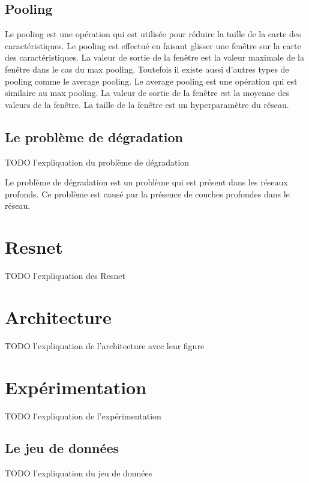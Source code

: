 \documentclass{article}
\begin{document}
\subsection{Pooling}
Le pooling est une opération qui est utilisée pour réduire la taille de la carte des caractéristiques.
Le pooling est effectué en faisant glisser une fenêtre sur la carte des caractéristiques.
La valeur de sortie de la fenêtre est la valeur maximale de la fenêtre dans le cas du max pooling.
Toutefois il existe aussi d'autres types de pooling comme le average pooling.
Le average pooling est une opération qui est similaire au max pooling.
La valeur de sortie de la fenêtre est la moyenne des valeurs de la fenêtre.
La taille de la fenêtre est un hyperparamètre du réseau.

\subsection{Le problème  de dégradation}

TODO l'expliquation du problème de dégradation

Le problème de dégradation est un problème qui est présent dans les réseaux profonds.
Ce problème est causé par la présence de couches profondes dans le réseau.




\section{Resnet}

TODO l'expliquation des Resnet

\section{Architecture}

TODO l'expliquation de l'architecture avec leur figure

\section{Expérimentation}

TODO l'expliquation de l'expérimentation

\subsection{Le jeu de données}

TODO l'expliquation du jeu de données
\end{document}
